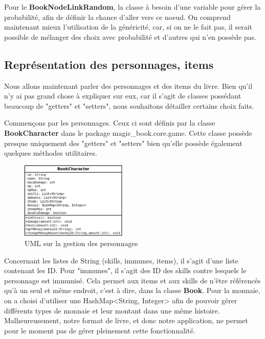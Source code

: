 			Pour le \textbf{BookNodeLinkRandom}, la classe à besoin d'une variable pour gérer la probabilité, afin de définir la chance d'aller vers ce noeud. On comprend maintenant mieux l'utilisation de la généricité, car, si on ne le fait pas, il serait possible de mélanger des choix avec probabilité et d'autres qui n'en possède pas.

		\subsection{Représentation des personnages, items}

			Nous allons maintenant parler des personnages et des items du livre. Bien qu'il n'y ai pas grand chose à expliquer sur eux, car il s'agit de classes possédant beaucoup de "getters" et "setters", nous souhaitons détailler certains choix faits.

			Commençons par les personnages. Ceux ci sont définis par la classe \textbf{BookCharacter} dans le package magic\_book.core.game. Cette classe possède presque uniquement des "getters" et "setters" bien qu'elle possède également quelques méthodes utilitaires.

			\begin{figure}[H]
				\centering\includegraphics[width=0.45\textwidth, keepaspectratio]{img/book_character.png}
				\caption{UML sur la gestion des personnages}
			\end{figure}

			Concernant les listes de String (skills, immunes, items), il s'agit d'une liste contenant les ID. Pour "immunes", il s'agit des ID des skills contre lesquels le personnage est immunisé. Cela permet aux items et aux skills de n'être référencés qu'à un seul et même endroit, c'est à dire, dans la classe \textbf{Book}. Pour la monnaie, on a choisi d'utiliser une HashMap<String, Integer> afin de pouvoir gérer différents types de monnaie et leur montant dans une même histoire. Malheureusement, notre format de livre, et donc notre application, ne permet pour le moment pas de gérer pleinement cette fonctionnalité.

